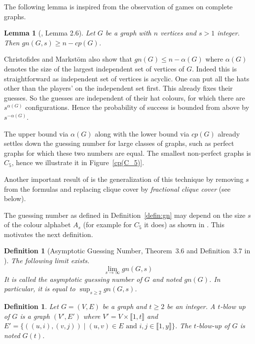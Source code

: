 \documentclass[11pt, a4paper]{kybernetika}
\newtheorem{lemma}[theorem]{Lemma}
\newtheorem{definition}[theorem]{Definition}
\begin{document}
	The following lemma is inspired from the observation of games on complete graphs. 
	
	\begin{lemma}[\cite{christofides2011guessing}, Lemma 2.6]\label{lem:cp}
		Let $G$ be a graph with $n$ vertices and $s>1$ integer. Then $gn(G,s)\ge n-cp(G)$.
	\end{lemma}
		
	Christofides and Markst\"om also show that $gn(G)\le n-\alpha(G)$ where $\alpha(G)$ denotes the size of the largest independent set of vertices of $G$. Indeed this is straightforward as independent set of vertices is acyclic. One can put all the hats other than the players' on the independent set first. This already fixes their guesses. So the guesses are independent of their hat colours, for which there are $s^{\alpha(G)}$ configurations. Hence the probability of success is bounded from above by $s^{-\alpha(G)}$.
	
	The upper bound via $\alpha(G)$ along with the lower bound via $cp(G)$ already settles down the guessing number for large classes of graphs, such as perfect graphs for which these two numbers are equal. The smallest non-perfect graphs is $C_5$, hence we illustrate it in Figure~\ref{cp(C_5)}.
	
	Another important result of \cite{christofides2011guessing} is the generalization of this technique by removing $s$ from the formulas and replacing clique cover by \emph{fractional clique cover} (see below).
	
	The guessing number as defined in Definition~\ref{defin:gn} may depend on the size $s$ of the colour alphabet $A_s$ (for example for $C_5$ it does) as shown in \cite{christofides2011guessing}. This motivates the next definition.
	
	\begin{definition}[Asymptotic Guessing Number, Theorem~3.6 and Definition~3.7 in \cite{christofides2011guessing}]
		The following limit exists.
		$$\lim_{s\to\infty}gn(G,s)$$
		It is called the \emph{asymptotic guessing number} of $G$ and noted $gn(G)$. In particular, it is equal to $\sup_{s\ge2}gn(G,s)$.
	\end{definition} 
	
	\begin{definition}
		Let $G=(V,E)$ be a graph and $t\ge 2$ be an integer. A \emph{$t$-blow up} of $G$ is a graph $(V',E')$ where $V'=V\times\llbracket1,t\rrbracket$ and $E'=\{((u,i),(v,j))\mid(u,v)\in E\text{ and }i,j\in\llbracket1,y\rrbracket\}$.
		The $t$-blow-up of $G$ is noted $G(t)$.
	\end{definition}
	
\end{document}
